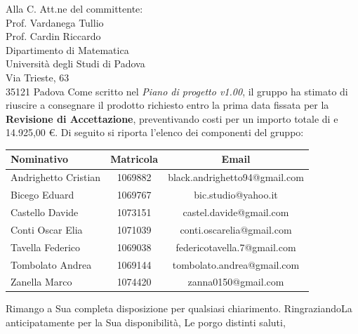 \documentclass[a4paper,12pt]{letteracdp}
\begin{document}
\begin{letter}{
		Alla C. Att.ne del committente: \\
		Prof. Vardanega Tullio \\
		Prof. Cardin Riccardo \\
		Dipartimento di Matematica \\
		Università degli Studi di Padova \\
		Via Trieste, 63 \\
		35121 Padova}
Come scritto nel \textit{Piano di progetto v1.00}, il gruppo ha stimato di riuscire a consegnare il prodotto richiesto entro la prima data fissata per la \textbf{Revisione di Accettazione}, preventivando costi per un importo totale di e 14.925,00 \euro. Di seguito si riporta l'elenco dei componenti del gruppo:

\begin{center}
		\begin{tabular}{l c c}
			\toprule
			\textbf{Nominativo} & \textbf{Matricola} & \textbf{Email} \\
			\midrule
			Andrighetto Cristian & 1069882 & black.andrighetto94@gmail.com \\
			Bicego Eduard & 1069767 & bic.studio@yahoo.it  \\
			Castello Davide	& 1073151 &	 castel.davide@gmail.com\\
			Conti Oscar Elia & 1071039 & conti.oscarelia@gmail.com \\
			Tavella Federico & 1069038 & federicotavella.7@gmail.com\\
			Tombolato Andrea & 1069144 & tombolato.andrea@gmail.com	 \\
			Zanella Marco & 1074420 & zanna0150@gmail.com \\
			\bottomrule
		\end{tabular}
\end{center}
		
		\closing{Rimango a Sua completa disposizione per qualsiasi chiarimento. RingraziandoLa anticipatamente per la Sua disponibilità, Le porgo distinti saluti,}
		
	\end{letter}
\end{document}
